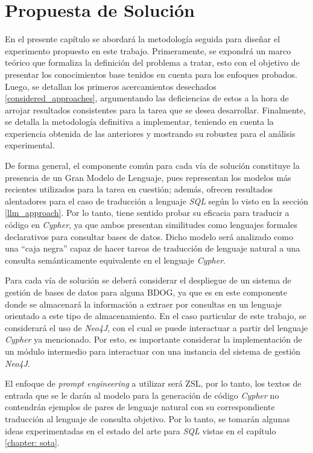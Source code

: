 \chapter{Propuesta de Solución}\label{chapter: proposedsolution}

En el presente capítulo se abordará la metodología seguida para diseñar el experimento propuesto en este trabajo. Primeramente, se expondrá un marco teórico que formaliza la definición del problema a tratar, esto con el objetivo de presentar los conocimientos base tenidos en cuenta para los enfoques probados. Luego, se detallan los primeros acercamientos desechados \ref{considered_approaches}, argumentando las deficiencias de estos a la hora de arrojar resultados consistentes para la tarea que se desea desarrollar. Finalmente, se detalla la metodología definitiva a implementar, teniendo en cuenta la experiencia obtenida de las anteriores y mostrando su robustez para el análisis experimental.

De forma general, el componente común para cada vía de solución constituye la presencia de un Gran Modelo de Lenguaje, pues representan los modelos más recientes utilizados para la tarea en cuestión; además, ofrecen resultados alentadores para el caso de traducción a lenguaje \textit{SQL} según lo visto en la sección \ref{llm_approach}. Por lo tanto, tiene sentido probar su eficacia para traducir a código en \textit{Cypher}, ya que ambos presentan similitudes como lenguajes formales declarativos para consultar bases de datos. Dicho modelo será analizado como una ``caja negra'' capaz de hacer tareas de traducción de lenguaje natural a una consulta semánticamente equivalente en el lenguaje \textit{Cypher}.

Para cada vía de solución se deberá considerar el despliegue de un sistema de gestión de bases de datos para alguna BDOG, ya que es en este componente donde se almacenará la información a extraer por consultas en un lenguaje orientado a este tipo de almacenamiento. En el caso particular de este trabajo, se considerará el uso de \textit{Neo4J}, con el cual se puede interactuar a partir del lenguaje \textit{Cypher} ya mencionado. Por esto, es importante considerar la implementación de un módulo intermedio para interactuar con una instancia del sistema de gestión \textit{Neo4J}.

El enfoque de \textit{prompt engineering} a utilizar será ZSL, por lo tanto, los textos de entrada que se le darán al modelo para la generación de código \textit{Cypher} no contendrán ejemplos de pares de lenguaje natural con su correspondiente traducción al lenguaje de consulta objetivo. Por lo tanto, se tomarán algunas ideas experimentadas en el estado del arte para \textit{SQL} vistas en el capítulo \ref{chapter: sota}.

